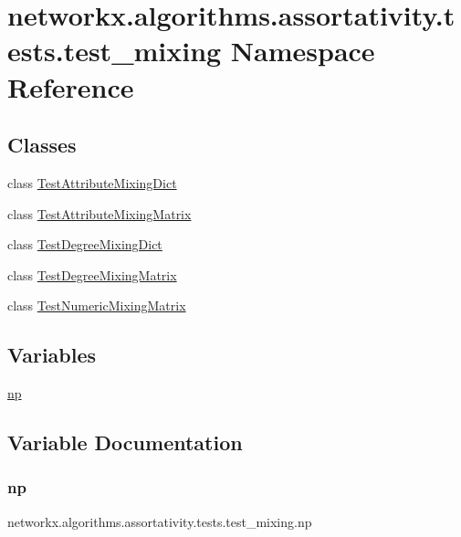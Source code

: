 \hypertarget{namespacenetworkx_1_1algorithms_1_1assortativity_1_1tests_1_1test__mixing}{}\section{networkx.\+algorithms.\+assortativity.\+tests.\+test\+\_\+mixing Namespace Reference}
\label{namespacenetworkx_1_1algorithms_1_1assortativity_1_1tests_1_1test__mixing}
\subsection*{Classes}
\begin{DoxyCompactItemize}
\item 
class \hyperlink{classnetworkx_1_1algorithms_1_1assortativity_1_1tests_1_1test__mixing_1_1TestAttributeMixingDict}{Test\+Attribute\+Mixing\+Dict}
\item 
class \hyperlink{classnetworkx_1_1algorithms_1_1assortativity_1_1tests_1_1test__mixing_1_1TestAttributeMixingMatrix}{Test\+Attribute\+Mixing\+Matrix}
\item 
class \hyperlink{classnetworkx_1_1algorithms_1_1assortativity_1_1tests_1_1test__mixing_1_1TestDegreeMixingDict}{Test\+Degree\+Mixing\+Dict}
\item 
class \hyperlink{classnetworkx_1_1algorithms_1_1assortativity_1_1tests_1_1test__mixing_1_1TestDegreeMixingMatrix}{Test\+Degree\+Mixing\+Matrix}
\item 
class \hyperlink{classnetworkx_1_1algorithms_1_1assortativity_1_1tests_1_1test__mixing_1_1TestNumericMixingMatrix}{Test\+Numeric\+Mixing\+Matrix}
\end{DoxyCompactItemize}
\subsection*{Variables}
\begin{DoxyCompactItemize}
\item 
\hyperlink{namespacenetworkx_1_1algorithms_1_1assortativity_1_1tests_1_1test__mixing_ad9ae795b8a5bcf4b3be0f1403aebc3df}{np}
\end{DoxyCompactItemize}


\subsection{Variable Documentation}
\mbox{\label{namespacenetworkx_1_1algorithms_1_1assortativity_1_1tests_1_1test__mixing_ad9ae795b8a5bcf4b3be0f1403aebc3df}} 
\subsubsection{\texorpdfstring{np}{np}}
{\footnotesize\ttfamily networkx.\+algorithms.\+assortativity.\+tests.\+test\+\_\+mixing.\+np}

